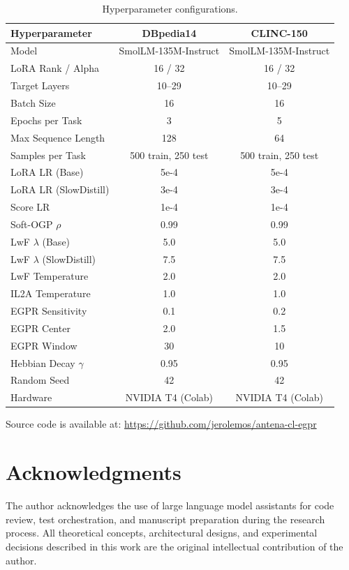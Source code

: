 \documentclass[11pt,a4paper]{article}
\begin{document}
\begin{table}[htbp]
\centering
\caption{Hyperparameter configurations.}
\label{tab:hyperparams}
\begin{tabular}{lcc}
\toprule
Hyperparameter & DBpedia14 & CLINC-150 \\
\midrule
Model & SmolLM-135M-Instruct & SmolLM-135M-Instruct \\
LoRA Rank / Alpha & 16 / 32 & 16 / 32 \\
Target Layers & 10--29 & 10--29 \\
Batch Size & 16 & 16 \\
Epochs per Task & 3 & 5 \\
Max Sequence Length & 128 & 64 \\
Samples per Task & 500 train, 250 test & 500 train, 250 test \\
LoRA LR (Base) & 5e-4 & 5e-4 \\
LoRA LR (SlowDistill) & 3e-4 & 3e-4 \\
Score LR & 1e-4 & 1e-4 \\
Soft-OGP $\rho$ & 0.99 & 0.99 \\
LwF $\lambda$ (Base) & 5.0 & 5.0 \\
LwF $\lambda$ (SlowDistill) & 7.5 & 7.5 \\
LwF Temperature & 2.0 & 2.0 \\
IL2A Temperature & 1.0 & 1.0 \\
EGPR Sensitivity & 0.1 & 0.2 \\
EGPR Center & 2.0 & 1.5 \\
EGPR Window & 30 & 10 \\
Hebbian Decay $\gamma$ & 0.95 & 0.95 \\
Random Seed & 42 & 42 \\
Hardware & NVIDIA T4 (Colab) & NVIDIA T4 (Colab) \\
\bottomrule
\end{tabular}
\end{table}

Source code is available at: \url{https://github.com/jerolemos/antena-cl-egpr}

\section*{Acknowledgments}

The author acknowledges the use of large language model assistants for code review, test orchestration, and manuscript preparation during the research process. All theoretical concepts, architectural designs, and experimental decisions described in this work are the original intellectual contribution of the author.
\end{document}
